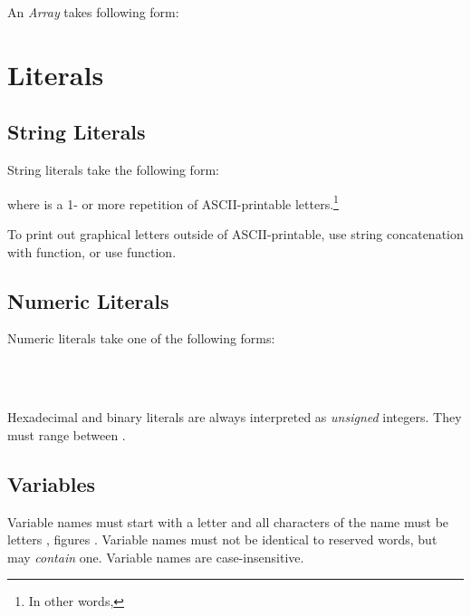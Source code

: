 An \emph{Array} takes following form:


\section{Literals}
\subsection{String Literals}

String literals take the following form:


where  is a 1- or more repetition of ASCII-printable letters.\footnote{In other words, }

To print out graphical letters outside of ASCII-printable, use string concatenation with  function, or use  function.

\subsection{Numeric Literals} 

Numeric literals take one of the following forms:

\\
\\

Hexadecimal and binary literals are always interpreted as \emph{unsigned} integers. They must range between \intrange.

\subsection{Variables} 

Variable names must start with a letter and all characters of the name must be letters , figures . Variable names must not be identical to reserved words, but may \emph{contain} one. Variable names are case-insensitive.

